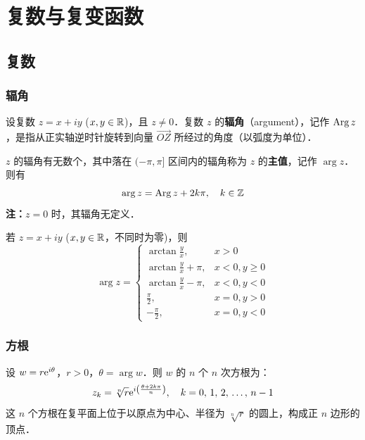 \documentclass[12pt, a4paper, oneside, UTF8]{ctexbook}
\begin{document}
%
\else
\fi

\chapter{复数与复变函数}
\section{复数}
\subsection{辐角}
\begin{definition}[辐角]
设复数 $z = x + iy$ ($x, y \in \mathbb{R}$)，且 $z \neq 0$．复数 $z$ 的\textbf{辐角}（argument），记作 $\operatorname{Arg} z$，是指从正实轴逆时针旋转到向量 $\overrightarrow{OZ}$ 所经过的角度（以弧度为单位）．
\end{definition}

\begin{definition}[辐角主值]
$z$ 的辐角有无数个，其中落在 $(-\pi, \pi]$ 区间内的辐角称为 $z$ 的\textbf{主值}，记作 $\arg z$．则有
\[\arg z = \operatorname{Arg} z + 2k\pi, \quad k \in \mathbb{Z}\]
\textbf{注：}$z = 0$ 时，其辐角无定义．
\end{definition}

\begin{theorem}[辐角主值的计算公式]
若 $z = x + iy$ ($x, y \in \mathbb{R}$，不同时为零)，则
\[
\arg z = 
\begin{cases}
\arctan\frac{y}{x}, & x > 0 \\[4pt]
\arctan\frac{y}{x} + \pi, & x < 0, y \ge 0 \\[4pt]
\arctan\frac{y}{x} - \pi, & x < 0, y < 0 \\[4pt]
\frac{\pi}{2}, & x = 0, y > 0 \\[4pt]
-\frac{\pi}{2}, & x = 0, y < 0
\end{cases}
\]
\end{theorem}

\subsection{方根}

\begin{theorem}[方根公式]
设 $w = r{\rm e}^{i\theta}$，$r > 0$，$\theta = \arg w$．则 $w$ 的 $n$ 个 $n$ 次方根为：
\[
z_k = \sqrt[n]{r} {\rm e}^{i\left(\frac{\theta + 2k\pi}{n}\right)}, \quad k = 0,\,1,\,2,\,\dots,\,n-1
\]
这 $n$ 个方根在复平面上位于以原点为中心、半径为 $\sqrt[n]{r}$ 的圆上，构成正 $n$ 边形的顶点．
\end{theorem}
\end{document}
